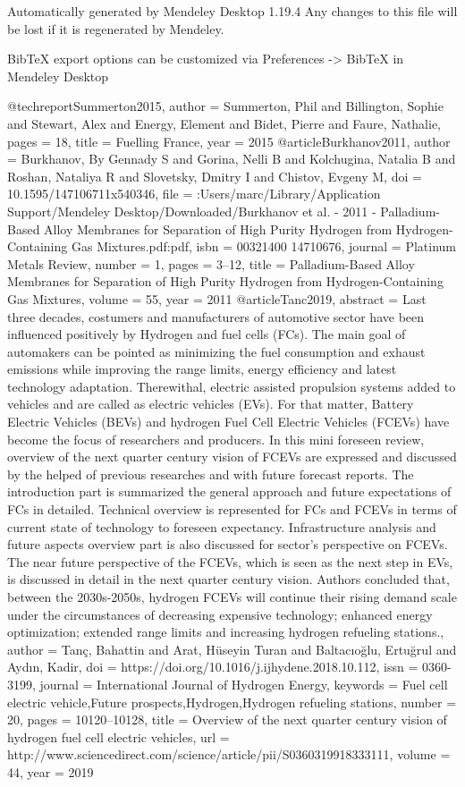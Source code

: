 Automatically generated by Mendeley Desktop 1.19.4
Any changes to this file will be lost if it is regenerated by Mendeley.

BibTeX export options can be customized via Preferences -> BibTeX in Mendeley Desktop

@techreport{Summerton2015,
author = {Summerton, Phil and Billington, Sophie and Stewart, Alex and Energy, Element and Bidet, Pierre and Faure, Nathalie},
pages = {18},
title = {{Fuelling France}},
year = {2015}
}
@article{Burkhanov2011,
author = {Burkhanov, By Gennady S and Gorina, Nelli B and Kolchugina, Natalia B and Roshan, Nataliya R and Slovetsky, Dmitry I and Chistov, Evgeny M},
doi = {10.1595/147106711x540346},
file = {:Users/marc/Library/Application Support/Mendeley Desktop/Downloaded/Burkhanov et al. - 2011 - Palladium-Based Alloy Membranes for Separation of High Purity Hydrogen from Hydrogen-Containing Gas Mixtures.pdf:pdf},
isbn = {00321400
14710676},
journal = {Platinum Metals Review},
number = {1},
pages = {3--12},
title = {{Palladium-Based Alloy Membranes for Separation of High Purity Hydrogen from Hydrogen-Containing Gas Mixtures}},
volume = {55},
year = {2011}
}
@article{Tanc2019,
abstract = {Last three decades, costumers and manufacturers of automotive sector have been influenced positively by Hydrogen and fuel cells (FCs). The main goal of automakers can be pointed as minimizing the fuel consumption and exhaust emissions while improving the range limits, energy efficiency and latest technology adaptation. Therewithal, electric assisted propulsion systems added to vehicles and are called as electric vehicles (EVs). For that matter, Battery Electric Vehicles (BEVs) and hydrogen Fuel Cell Electric Vehicles (FCEVs) have become the focus of researchers and producers. In this mini foreseen review, overview of the next quarter century vision of FCEVs are expressed and discussed by the helped of previous researches and with future forecast reports. The introduction part is summarized the general approach and future expectations of FCs in detailed. Technical overview is represented for FCs and FCEVs in terms of current state of technology to foreseen expectancy. Infrastructure analysis and future aspects overview part is also discussed for sector's perspective on FCEVs. The near future perspective of the FCEVs, which is seen as the next step in EVs, is discussed in detail in the next quarter century vision. Authors concluded that, between the 2030s-2050s, hydrogen FCEVs will continue their rising demand scale under the circumstances of decreasing expensive technology; enhanced energy optimization; extended range limits and increasing hydrogen refueling stations.},
author = {Tan{\c{c}}, Bahattin and Arat, H{\"{u}}seyin Turan and Baltacıoğlu, Ertuğrul and Aydın, Kadir},
doi = {https://doi.org/10.1016/j.ijhydene.2018.10.112},
issn = {0360-3199},
journal = {International Journal of Hydrogen Energy},
keywords = {Fuel cell electric vehicle,Future prospects,Hydrogen,Hydrogen refueling stations},
number = {20},
pages = {10120--10128},
title = {{Overview of the next quarter century vision of hydrogen fuel cell electric vehicles}},
url = {http://www.sciencedirect.com/science/article/pii/S0360319918333111},
volume = {44},
year = {2019}
}
